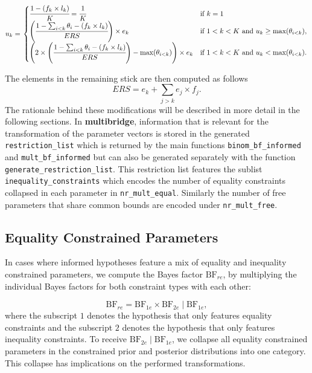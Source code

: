 \begin{appendix}
\begin{align}
u_k = \left.
\begin{cases}
\cfrac{1 - (f_k \times l_k)}{K} = \cfrac{1}{K} & \text{if } k = 1 \\
\left( \cfrac{1 - \sum_{i < k} \theta_i - (f_k \times l_k)}{ERS} \right) \times e_k & \text{if } 1 < k < K \text{ and } u_k \geq \text{max}(\theta_{i < k}), \\
\left( 2 \times \left( \cfrac{1 - \sum_{i < k} \theta_i - (f_k \times l_k)}{ERS} \right) - \text{max}(\theta_{i < k}) \right)  \times e_k & \text{if } 1 < k < K \text{ and } u_k < \text{max}(\theta_{i < k}).
\end{cases}
\right.
\end{align}

The elements in the remaining stick are then computed as follows
\[ERS = e_k + \sum_{j > k} e_j \times f_j.\] The rationale behind these
modifications will be described in more detail in the following
sections. In \textbf{multibridge}, information that is relevant for the
transformation of the parameter vectors is stored in the generated
\texttt{restriction\_list} which is returned by the main functions
\texttt{binom\_bf\_informed} and \texttt{mult\_bf\_informed} but can
also be generated separately with the function
\texttt{generate\_restriction\_list}. This restriction list features the
sublist \texttt{inequality\_constraints} which encodes the number of
equality constraints collapsed in each parameter in
\texttt{nr\_mult\_equal}. Similarly the number of free parameters that
share common bounds are encoded under \texttt{nr\_mult\_free}.

\hypertarget{equality-constrained-parameters}{%
\subsection{Equality Constrained
Parameters}\label{equality-constrained-parameters}}

In cases where informed hypotheses feature a mix of equality and
inequality constrained parameters, we compute the Bayes factor
\(\text{BF}_{re}\), by multiplying the individual Bayes factors for both
constraint types with each other:

\[
\text{BF}_{re}
= \text{BF}_{1e} \times \text{BF}_{2e} \mid \text{BF}_{1e},
\] where the subscript \(1\) denotes the hypothesis that only features
equality constraints and the subscript \(2\) denotes the hypothesis that
only features inequality constraints. To receive
\(\text{BF}_{2e} \mid \text{BF}_{1e}\), we collapse all equality
constrained parameters in the constrained prior and posterior
distributions into one category. This collapse has implications on the
performed transformations.


\end{appendix}
